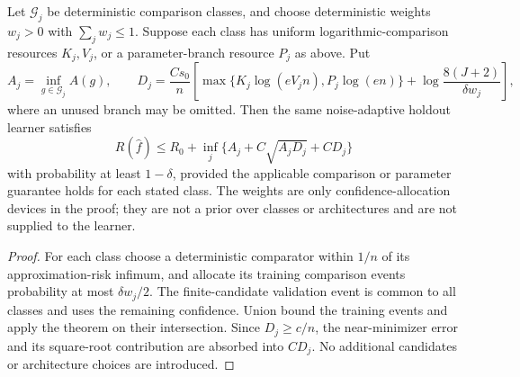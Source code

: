 \begin{corollary}
\label{cor:log-comparison-class-oracle}
Let $\mathcal G_j$ be deterministic comparison classes, and choose deterministic weights $w_j>0$ with $\sum_jw_j\le1$. Suppose each class has uniform logarithmic-comparison resources $K_j,V_j$, or a parameter-branch resource $P_j$ as above. Put
\[
 A_j=\inf_{g\in\mathcal G_j}A(g),\qquad
 D_j=\frac{C s_0}{n}\left[
 \max\{K_j\log(eV_jn),P_j\log(en)\}
 +\log\frac{8(J+2)}{\delta w_j}\right],
\]
where an unused branch may be omitted. Then the same noise-adaptive holdout learner satisfies
\[
 R(\widehat f)\le R_0+
 \inf_j\{A_j+C\sqrt{A_jD_j}+CD_j\}
\]
with probability at least $1-\delta$, provided the applicable comparison or parameter guarantee holds for each stated class. The weights are only confidence-allocation devices in the proof; they are not a prior over classes or architectures and are not supplied to the learner.
\end{corollary}
\begin{proof}
For each class choose a deterministic comparator within $1/n$ of its approximation-risk infimum, and allocate its training comparison events probability at most $\delta w_j/2$. The finite-candidate validation event is common to all classes and uses the remaining confidence. Union bound the training events and apply the theorem on their intersection. Since $D_j\ge c/n$, the near-minimizer error and its square-root contribution are absorbed into $CD_j$. No additional candidates or architecture choices are introduced.
\end{proof}
